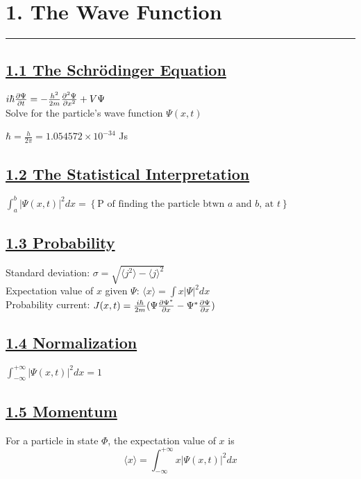 \section{1. The Wave Function} \hrule height 0.3pt \thinspace

\subsection{\underline{1.1 The Schr\"{o}dinger Equation}}

$i \hbar \pdv{\Psi}{t} = - \frac{h^2}{2m} \pdv[2]{\Psi}{x} + V \Psi$ \\
Solve for the particle's wave function $\Psi(x, t)$

$\hbar = \frac{h}{2\pi} = 1.054572 \times 10^{-34}$ Js \\

\subsection{\underline{1.2 The Statistical Interpretation}}

$\int_{a}^{b} |\Psi(x, t)|^2 dx = \left\{ \textrm{P of finding the particle btwn $a$ and $b$, at $t$} \right\}$ \\

\subsection{\underline{1.3 Probability}}
Standard deviation: $\sigma = \sqrt{\langle j^2 \rangle - \langle j \rangle ^2}$ \\
Expectation value of $x$ given $\Psi$: $\langle x \rangle = \int x |\Psi|^2 dx$ \\
Probability current: $J(x, t)=\frac{i \hbar}{2m} (\Psi \pdv{\Psi^*}{x} - \Psi^* \pdv{\Psi}{x})$

\subsection{\underline{1.4 Normalization}}

$\int_{-\infty}^{+\infty} |\Psi (x, t)|^2 dx = 1$

\subsection{\underline{1.5 Momentum}}
For a particle in state $\Phi$, the expectation value of $x$ is
    $$\langle x \rangle = \int_{-\infty}^{+\infty} x |\Psi(x, t)|^2 dx$$

